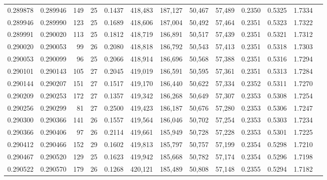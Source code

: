 \begin{tabular}{rrrrrrrrrrrrr}
0.289878 & 0.289946 &   149 &  25 &                                     0.1437 & 418,483 & 187,127 &  50,467 &  57,489 & 0.2350 & 0.5325 & 1.7334 \\
0.289946 & 0.289990 &   123 &  25 &                                     0.1689 & 418,606 & 187,004 &  50,492 &  57,464 & 0.2351 & 0.5323 & 1.7322 \\
0.289991 & 0.290020 &   113 &  25 &                                     0.1812 & 418,719 & 186,891 &  50,517 &  57,439 & 0.2351 & 0.5321 & 1.7312 \\
0.290020 & 0.290053 &    99 &  26 &                                     0.2080 & 418,818 & 186,792 &  50,543 &  57,413 & 0.2351 & 0.5318 & 1.7303 \\
0.290053 & 0.290099 &    96 &  25 &                                     0.2066 & 418,914 & 186,696 &  50,568 &  57,388 & 0.2351 & 0.5316 & 1.7294 \\
0.290101 & 0.290143 &   105 &  27 &                                     0.2045 & 419,019 & 186,591 &  50,595 &  57,361 & 0.2351 & 0.5313 & 1.7284 \\
0.290144 & 0.290207 &   151 &  27 &                                     0.1517 & 419,170 & 186,440 &  50,622 &  57,334 & 0.2352 & 0.5311 & 1.7270 \\
0.290209 & 0.290253 &   172 &  27 &                                     0.1357 & 419,342 & 186,268 &  50,649 &  57,307 & 0.2353 & 0.5308 & 1.7254 \\
0.290256 & 0.290299 &    81 &  27 &                                     0.2500 & 419,423 & 186,187 &  50,676 &  57,280 & 0.2353 & 0.5306 & 1.7247 \\
0.290300 & 0.290366 &   141 &  26 &                                     0.1557 & 419,564 & 186,046 &  50,702 &  57,254 & 0.2353 & 0.5303 & 1.7234 \\
0.290366 & 0.290406 &    97 &  26 &                                     0.2114 & 419,661 & 185,949 &  50,728 &  57,228 & 0.2353 & 0.5301 & 1.7225 \\
0.290412 & 0.290466 &   152 &  29 &                                     0.1602 & 419,813 & 185,797 &  50,757 &  57,199 & 0.2354 & 0.5298 & 1.7210 \\
0.290467 & 0.290520 &   129 &  25 &                                     0.1623 & 419,942 & 185,668 &  50,782 &  57,174 & 0.2354 & 0.5296 & 1.7198 \\
0.290522 & 0.290570 &   179 &  26 &                                     0.1268 & 420,121 & 185,489 &  50,808 &  57,148 & 0.2355 & 0.5294 & 1.7182 \\

\end{tabular}
